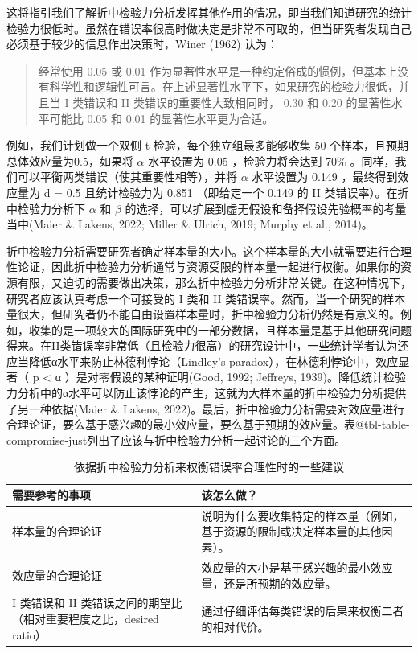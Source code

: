 \documentclass[
  letterpaper,
  DIV=11,
  numbers=noendperiod]{scrreprt}
\begin{document}
这将指引我们了解折中检验力分析发挥其他作用的情况，即当我们知道研究的统计检验力很低时。虽然在错误率很高时做决定是非常不可取的，但当研究者发现自己必须基于较少的信息作出决策时，Winer
(1962) 认为：

\begin{quote}
经常使用 0.05 或 0.01
作为显著性水平是一种约定俗成的惯例，但基本上没有科学性和逻辑性可言。在上述显著性水平下，如果研究的检验力很低，并且当
I 类错误和 II 类错误的重要性大致相同时， 0.30 和 0.20 的显著性水平可能比
0.05 和 0.01 的显著性水平更为合适。
\end{quote}

例如，我们计划做一个双侧 t 检验，每个独立组最多能够收集 50
个样本，且预期总体效应量为0.5，如果将 \(\alpha\) 水平设置为 0.05
，检验力将会达到 70\%
。同样，我们可以平衡两类错误（使其重要性相等），并将 \(\alpha\)
水平设置为 0.149 ，最终得到效应量为 d = 0.5 且统计检验力为 0.851
（即给定一个 0.149 的 II 类错误率）。在折中检验力分析下 \(\alpha\) 和
\(\beta\) 的选择，可以扩展到虚无假设和备择假设先验概率的考量当中(Maier
\& Lakens, 2022; Miller \& Ulrich, 2019; Murphy et al., 2014)。

折中检验力分析需要研究者确定样本量的大小。这个样本量的大小就需要进行合理性论证，因此折中检验力分析通常与资源受限的样本量一起进行权衡。如果你的资源有限，又迫切的需要做出决策，那么折中检验力分析非常关键。在这种情况下，研究者应该认真考虑一个可接受的
I 类和 II
类错误率。然而，当一个研究的样本量很大，但研究者仍不能自由设置样本量时，折中检验力分析仍然是有意义的。例如，收集的是一项较大的国际研究中的一部分数据，且样本量是基于其他研究问题得来。在II类错误率非常低（且检验力很高）的研究设计中，一些统计学者认为还应当降低α水平来防止林德利悖论（Lindley's
paradox），在林德利悖论中，效应显著（ p \textless{} α
）是对零假设的某种证明(Good, 1992; Jeffreys,
1939)。降低统计检验力分析中的α水平可以防止该悖论的产生，这就为大样本量的折中检验力分析提供了另一种依据(Maier
\& Lakens,
2022)。最后，折中检验力分析需要对效应量进行合理论证，要么基于感兴趣的最小效应量，要么基于预期的效应量。表@tbl-table-compromise-just列出了应该与折中检验力分析一起讨论的三个方面。

\hypertarget{tbl-table-compromise-just}{}
\begin{table}
\caption{\label{tbl-table-compromise-just}依据折中检验力分析来权衡错误率合理性时的一些建议 }\tabularnewline

\centering
\begin{tabular}{>{\raggedright\arraybackslash}p{5cm}|>{\raggedright\arraybackslash}p{10cm}}
\hline
需要参考的事项 & 该怎么做？\\
\hline
样本量的合理论证 & 说明为什么要收集特定的样本量（例如，基于资源的限制或决定样本量的其他因素）。\\
\hline
效应量的合理论证 & 效应量的大小是基于感兴趣的最小效应量，还是所预期的效应量。\\
\hline
I 类错误和 II 类错误之间的期望比（相对重要程度之比，desired ratio） & 通过仔细评估每类错误的后果来权衡二者的相对代价。\\
\hline
\end{tabular}
\end{table}
\end{document}
